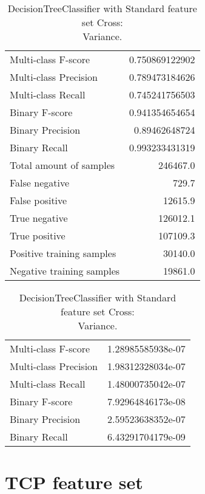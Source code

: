 \begin{table}[H]
\begin{minipage}{0.5\textwidth}
\caption{DecisionTreeClassifier with Standard feature set Cross: \\Average.}
\centering
\begin{tabular}{l r}
\toprule
Multi-class F-score & 0.750869122902 \\
Multi-class Precision & 0.789473184626 \\
Multi-class Recall & 0.745241756503 \\
\midrule
Binary F-score & 0.941354654654 \\
Binary Precision & 0.89462648724 \\
Binary Recall & 0.993233431319 \\
\midrule
Total amount of samples & 246467.0 \\
False negative & 729.7 \\
False positive & 12615.9 \\
True negative & 126012.1 \\
True positive & 107109.3 \\
\midrule
Positive training samples & 30140.0 \\
Negative training samples & 19861.0 \\
\bottomrule
\end{tabular}
\end{minipage}
\hfillx
\begin{minipage}{0.5\textwidth}
\caption{DecisionTreeClassifier with Standard feature set Cross: \\Variance.}
\centering
\begin{tabular}{l r}
\toprule
Multi-class F-score & 1.28985585938e-07 \\
Multi-class Precision & 1.98312328034e-07 \\
Multi-class Recall & 1.48000735042e-07 \\
\midrule
Binary F-score & 7.92964846173e-08 \\
Binary Precision & 2.59523638352e-07 \\
Binary Recall & 6.43291704179e-09 \\
\bottomrule
\end{tabular}
\end{minipage}
\end{table}

\newpage
\section{TCP feature set}
